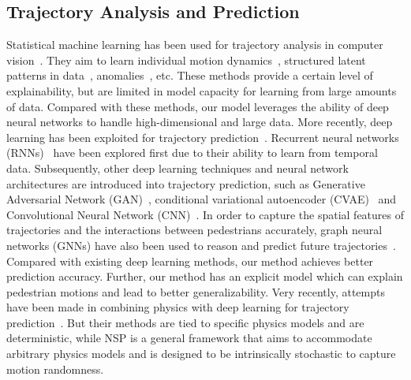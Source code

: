\documentclass[runningheads]{llncs}
\begin{document}
\subsection{Trajectory Analysis and Prediction}
Statistical machine learning has been used for trajectory analysis in computer vision~\cite{oliver2000bayesian,ellis2009modelling,wang2011trajectory,kim2015interactive,wang2016globally,chaker2017social}. They aim to learn individual motion dynamics~\cite{zhou2011random}, structured latent patterns in data~\cite{wang2016globally,wang_trending_2016}, anomalies~\cite{charalambous2014data,chaker2017social}, etc. These methods provide a certain level of explainability, but are limited in model capacity for learning from large amounts of data. Compared
with these methods, our model leverages the ability of deep neural networks to handle high-dimensional and large data. More recently, deep learning has been exploited for trajectory prediction~\cite{sighencea2021review}. Recurrent neural networks (RNNs)~\cite{alahi2016social,bartoli2018context,vemula2018social} have been explored first due to their ability to learn from temporal data. Subsequently, other  deep learning techniques and neural network architectures are introduced into trajectory prediction, such as Generative Adversarial Network (GAN)~\cite{gupta2018social}, conditional variational autoencoder (CVAE)~\cite{ivanovic2019trajectron,mangalam2020not,zhou2021sliding} and Convolutional Neural Network (CNN)~\cite{mohamed2020social}. In order to capture the spatial features of trajectories and the interactions between pedestrians accurately, graph neural networks (GNNs) have also been used to reason and predict future trajectories~\cite{mohamed2020social,shi2021sgcn}. 
Compared with existing deep learning methods, our method achieves better prediction accuracy. Further, our method has an explicit model which can explain pedestrian motions and lead to better generalizability. Very recently, attempts have been made in combining physics with deep learning for trajectory prediction~{\cite{antonucci2020generating,kreiss2021deep,hossain2022sfmgnet}}. But their methods are tied to specific physics models and are deterministic, while NSP is a general framework that aims to accommodate arbitrary physics models and is designed to be intrinsically stochastic to capture motion randomness.
\end{document}
